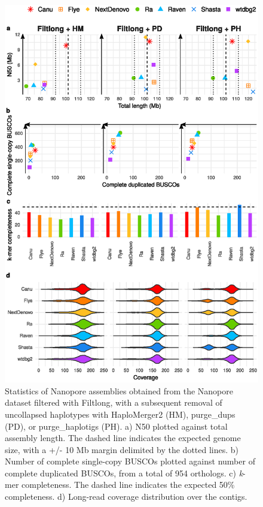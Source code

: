      \begin{figure}[ht]
    \centering
     \includegraphics[width=13.5cm]{fig/benchmark/supp_nanopore_filtlong_purging_v20210310.eps}
   \caption{Statistics of Nanopore assemblies obtained from the Nanopore dataset filtered with Filtlong, with a subsequent removal of uncollapsed haplotypes with HaploMerger2 (HM), purge\_dups (PD), or purge\_haplotigs (PH). a) N50 plotted against total assembly length. The dashed line indicates the expected genome size, with a +/- 10 Mb margin delimited by the dotted lines. b) Number of complete single-copy BUSCOs plotted against number of complete duplicated BUSCOs, from a total of 954 orthologs. c) \textit{k}-mer completeness. The dashed line indicates the expected 50\% completeness. d) Long-read coverage distribution over the contigs.}
   \label{fig:nanopore_filtlong_purging}
 \end{figure}
 
